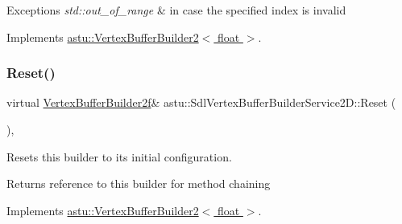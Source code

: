 \begin{DoxyExceptions}{Exceptions}
{\em std\+::out\+\_\+of\+\_\+range} & in case the specified index is invalid \\
\hline
\end{DoxyExceptions}


Implements \hyperlink{classastu_1_1VertexBufferBuilder2_ae9ecf15e9ddafcdac089ebe61e37a242}{astu\+::\+Vertex\+Buffer\+Builder2$<$ float $>$}.

\mbox{\label{classastu_1_1SdlVertexBufferBuilderService2D_a0a9bae699849ddf8ce74f591857e00d9}} 
\subsubsection{\texorpdfstring{Reset()}{Reset()}}
{\footnotesize\ttfamily virtual \hyperlink{group__gfx__group_ga45033e159deced790d4dc3968ad8e878}{Vertex\+Buffer\+Builder2f}\& astu\+::\+Sdl\+Vertex\+Buffer\+Builder\+Service2\+D\+::\+Reset (\begin{DoxyParamCaption}{ }\end{DoxyParamCaption})\hspace{0.3cm}{\ttfamily [override]}, {\ttfamily [virtual]}}

Resets this builder to its initial configuration.

\begin{DoxyReturn}{Returns}
reference to this builder for method chaining 
\end{DoxyReturn}


Implements \hyperlink{classastu_1_1VertexBufferBuilder2_a13de4c923fb8e44b99f6cd36430dd369}{astu\+::\+Vertex\+Buffer\+Builder2$<$ float $>$}.

\mbox{\label{classastu_1_1SdlVertexBufferBuilderService2D_a1263227c82ffd1ecd6cd53612d1d4b4b}} 
